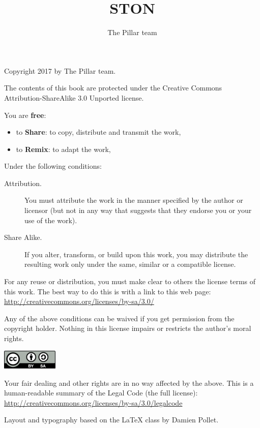 \documentclass[10pt,twoside,english]{_support/latex/sbabook/sbabook}
\title{STON}
\author{The Pillar team}
\begin{document}
\maketitle
\pagestyle{titlingpage}
\thispagestyle{titlingpage} %

\cleartoverso
{\small

  Copyright 2017 by The Pillar team.

  The contents of this book are protected under the Creative Commons
  Attribution-ShareAlike 3.0 Unported license.

  You are \textbf{free}:
  \begin{itemize}
  \item to \textbf{Share}: to copy, distribute and transmit the work,
  \item to \textbf{Remix}: to adapt the work,
  \end{itemize}

  Under the following conditions:
  \begin{description}
  \item[Attribution.] You must attribute the work in the manner specified by the
    author or licensor (but not in any way that suggests that they endorse you
    or your use of the work).
  \item[Share Alike.] If you alter, transform, or build upon this work, you may
    distribute the resulting work only under the same, similar or a compatible
    license.
  \end{description}

  For any reuse or distribution, you must make clear to others the
  license terms of this work. The best way to do this is with a link to
  this web page: \\
  \url{http://creativecommons.org/licenses/by-sa/3.0/}

  Any of the above conditions can be waived if you get permission from
  the copyright holder. Nothing in this license impairs or restricts the
  author's moral rights.

  \begin{center}
    \includegraphics[width=0.2\textwidth]{_support/latex/sbabook/CreativeCommons-BY-SA.pdf}
  \end{center}

  Your fair dealing and other rights are in no way affected by the
  above. This is a human-readable summary of the Legal Code (the full
  license): \\
  \url{http://creativecommons.org/licenses/by-sa/3.0/legalcode}

  \vfill

  Layout and typography based on the  \LaTeX{} class by Damien
  Pollet.
}
\end{document}
